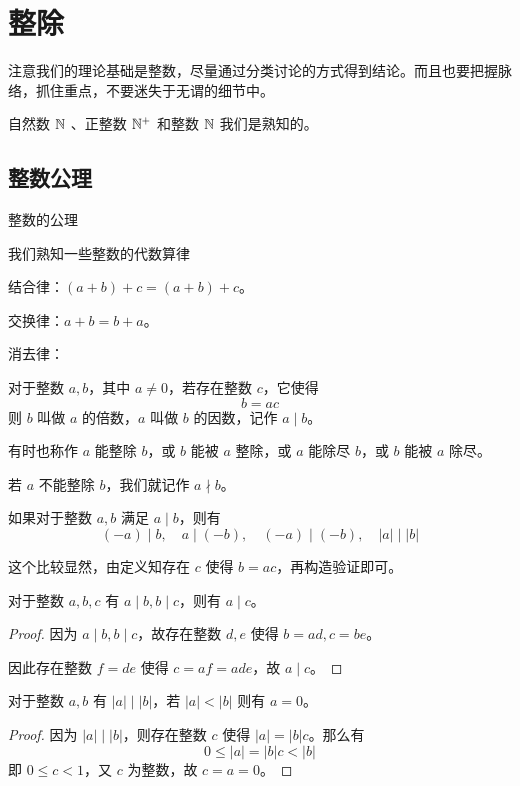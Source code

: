 \chapter{整除}

注意我们的理论基础是整数，尽量通过分类讨论的方式得到结论。而且也要把握脉络，抓住重点，不要迷失于无谓的细节中。

自然数 $\mathbb{N}$ 、正整数 $\mathbb{N}^+$ 和整数 $\mathbb{N}$ 我们是熟知的。

\section{整数公理}

整数的公理

我们熟知一些整数的代数算律

结合律：$(a+b)+c = (a+b)+c$。

交换律：$a+b = b+a$。

消去律：

\begin{definition}
	对于整数 $a,b$，其中 $a\ne 0$，若存在整数 $c$，它使得
	$$b=ac$$
	则 $b$ 叫做 $a$ 的倍数，$a$ 叫做 $b$ 的因数，记作 $a \mid b$。
\end{definition}

有时也称作 $a$ 能整除 $b$，或 $b$ 能被 $a$ 整除，或 $a$ 能除尽 $b$，或 $b$ 能被 $a$ 除尽。

若 $a$ 不能整除 $b$，我们就记作 $a \nmid b$。

\begin{lemma}
	如果对于整数 $a,b$ 满足 $a \mid b$，则有
	$$(-a) \mid b,\quad a \mid (-b),\quad (-a) \mid (-b),\quad |a| \mid |b|$$
\end{lemma}

这个比较显然，由定义知存在 $c$ 使得 $b=ac$，再构造验证即可。

\begin{lemma}
	对于整数 $a,b,c$ 有 $a \mid b,b \mid c$，则有 $a \mid c$。
\end{lemma}

\begin{proof}
	因为 $a \mid b,b \mid c$，故存在整数 $d,e$ 使得 $b=ad,c=be$。

	因此存在整数 $f=de$ 使得 $c=af=ade$，故 $a \mid c$。
\end{proof}

\begin{lemma}
	对于整数 $a,b$ 有 $|a| \mid |b|$，若 $|a|<|b|$ 则有 $a=0$。
\end{lemma}

\begin{proof}
	因为 $|a| \mid |b|$，则存在整数 $c$ 使得 $|a|=|b|c$。那么有
	$$0 \leqslant |a|=|b|c<|b|$$
	即 $0\leqslant c<1$，又 $c$ 为整数，故 $c=a=0$。
\end{proof}

